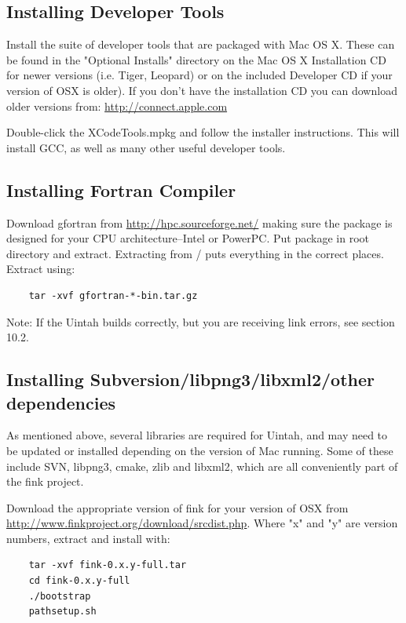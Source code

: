 \documentclass[12pt]{article}
\begin{document}
\subsection{Installing Developer Tools}
Install the suite of developer tools that are packaged with Mac OS X.
These can be found in the "Optional Installs" directory on the Mac OS
X Installation CD for newer versions (i.e. Tiger, Leopard) or on the
included Developer CD if your version of OSX is older). If you don't
have the installation CD you can download older versions from:
\url{http://connect.apple.com}

Double-click the XCodeTools.mpkg and follow the installer
instructions.  This will install GCC, as well as many other useful
developer tools.

\subsection{Installing Fortran Compiler}
Download gfortran from \url{http://hpc.sourceforge.net/} making sure
the package is designed for your CPU architecture--Intel or PowerPC.
Put package in root directory and extract.  Extracting from / puts
everything in the correct places.  Extract using:

\begin{verbatim}
	tar -xvf gfortran-*-bin.tar.gz
\end{verbatim}

Note: If the Uintah builds correctly, but you are receiving link errors, see section 10.2.

\subsection{Installing Subversion/libpng3/libxml2/other dependencies}
As mentioned above, several libraries are required for Uintah, and may
need to be updated or installed depending on the version of Mac
running.  Some of these include SVN, libpng3, cmake, zlib and libxml2,
which are all conveniently part of the fink project.

Download the appropriate version of fink for your version of OSX from
\url{http://www.finkproject.org/download/srcdist.php}.  Where "x" and
"y" are version numbers, extract and install with:

\begin{verbatim}
	tar -xvf fink-0.x.y-full.tar 
	cd fink-0.x.y-full
	./bootstrap 
	pathsetup.sh
\end{verbatim}
\end{document}

